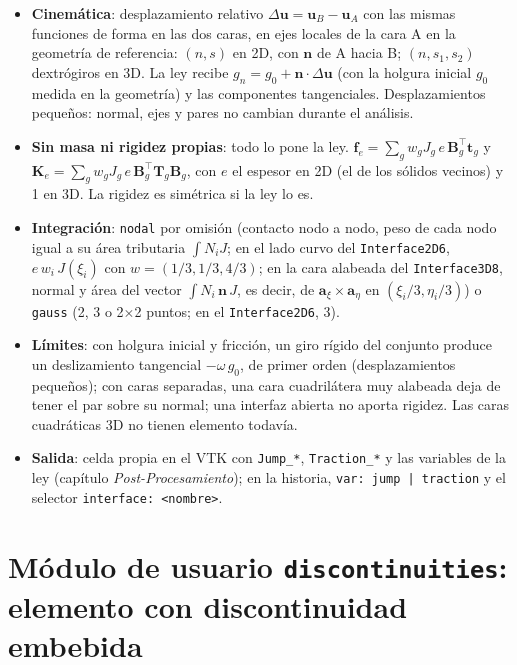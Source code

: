 \documentclass[11pt,oneside]{report}
\begin{document}
\begin{itemize}
  \item \textbf{Cinemática}: desplazamiento relativo $\Delta\mathbf u = \mathbf u_B - \mathbf u_A$ con las mismas funciones de forma en las dos caras, en ejes locales de la cara A en la geometría de referencia: $(n, s)$ en 2D, con $\mathbf n$ de A hacia B; $(n, s_1, s_2)$ dextrógiros en 3D. La ley recibe $g_n = g_0 + \mathbf n\cdot\Delta\mathbf u$ (con la holgura inicial $g_0$ medida en la geometría) y las componentes tangenciales. Desplazamientos pequeños: normal, ejes y pares no cambian durante el análisis.
  \item \textbf{Sin masa ni rigidez propias}: todo lo pone la ley. $\mathbf f_e = \sum_g w_g J_g\,e\,\mathbf B_g^\top\mathbf t_g$ y $\mathbf K_e = \sum_g w_g J_g\,e\,\mathbf B_g^\top\mathbf T_g\mathbf B_g$, con $e$ el espesor en 2D (el de los sólidos vecinos) y 1 en 3D. La rigidez es simétrica si la ley lo es.
  \item \textbf{Integración}: \texttt{nodal} por omisión (contacto nodo a nodo, peso de cada nodo igual a su área tributaria $\int N_i J$; en el lado curvo del \texttt{Interface2D6}, $e\,w_i\,J(\xi_i)$ con $w = (1/3, 1/3, 4/3)$; en la cara alabeada del \texttt{Interface3D8}, normal y área del vector $\int N_i\,\mathbf n\,J$, es decir, de $\mathbf a_\xi \times \mathbf a_\eta$ en $(\xi_i/3, \eta_i/3)$) o \texttt{gauss} (2, 3 o 2\ensuremath{\times}2 puntos; en el \texttt{Interface2D6}, 3).
  \item \textbf{Límites}: con holgura inicial y fricción, un giro rígido del conjunto produce un deslizamiento tangencial $-\omega\,g_0$, de primer orden (desplazamientos pequeños); con caras separadas, una cara cuadrilátera muy alabeada deja de tener el par sobre su normal; una interfaz abierta no aporta rigidez. Las caras cuadráticas 3D no tienen elemento todavía.
  \item \textbf{Salida}: celda propia en el VTK con \texttt{Jump\_*}, \texttt{Traction\_*} y las variables de la ley (capítulo \textit{Post-Procesamiento}); en la historia, \texttt{var: jump | traction} y el selector \texttt{interface: \textless{}nombre\textgreater{}}.
\end{itemize}

\section{Módulo de usuario \texttt{discontinuities}: elemento con discontinuidad embebida}
\end{document}
